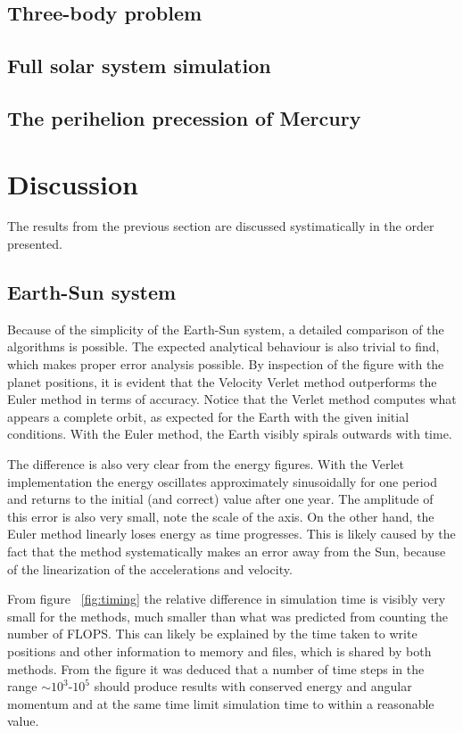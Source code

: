 \documentclass[aps,reprint]{revtex4-1}
\begin{document}
\subsection{Three-body problem}
\subsection{Full solar system simulation}
\subsection{The perihelion precession of Mercury}

\section{Discussion}
\label{sec:discussion}
The results from the previous section are discussed systimatically in the order
presented.
\subsection{Earth-Sun system}
Because of the simplicity of the Earth-Sun system, a detailed comparison of the
algorithms is possible. The expected analytical behaviour is also trivial to
find, which makes proper error analysis possible. By inspection of the figure with the
planet positions, it is evident that the Velocity Verlet method outperforms
the Euler method in terms of accuracy. Notice that the Verlet method computes what
appears a complete orbit, as expected for the Earth with the given initial conditions.
With the Euler method, the Earth visibly spirals outwards with time.

The difference is also very clear from the energy figures. With the Verlet
implementation the energy oscillates approximately sinusoidally for one period
and returns to the initial (and correct) value after one year. The amplitude of
this error is also very small, note the scale of the axis.
On the other hand, the Euler method linearly loses energy as time progresses. This
is likely caused by the fact that the method systematically makes an error away
from the Sun, because of the linearization of the accelerations and velocity.

From figure ~\ref{fig:timing} the relative difference in simulation time is visibly
very small for the methods, much smaller than what was predicted from counting
the number of FLOPS. This can likely be explained by the time taken to write
positions and other information to memory and files, which is shared by both methods.
From the figure it was
deduced that a number of time steps in the range $\sim 10^3$-$10^5$ should produce
results with conserved energy and angular momentum and at the same time limit
simulation time to within a reasonable value.
\end{document}
